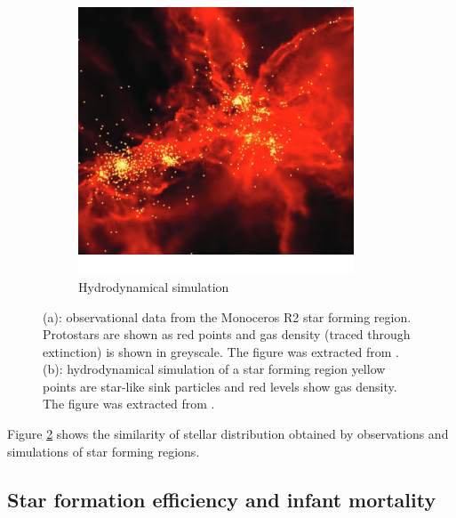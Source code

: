\begin{figure}
\begin{subfigure}[b]{0.48\textwidth}
        \includegraphics[width=0.9\textwidth]{Figures/0_clumpssimulated.png}
        \caption{Hydrodynamical simulation}
        \label{Fig:0_clumps_sim}
    \end{subfigure}
\caption{(a): observational data from the Monoceros R2 star forming region. Protostars are shown as red  points and gas density (traced through extinction) is shown in greyscale. The figure was extracted from \cite{Gutermuth2011}. (b): hydrodynamical simulation of a star forming region yellow points are star-like sink particles and red levels show gas density. The figure was extracted from \cite{Bonnell2011}.}
\label{Fig:0_clumps}
\end{figure}

Figure \ref{Fig:0_clumps} shows the similarity of stellar distribution obtained by observations and simulations of star forming regions.


\subsection{Star formation efficiency and infant mortality}



